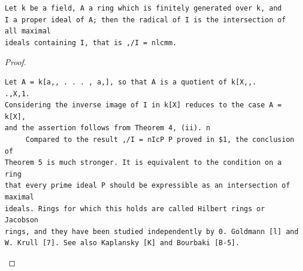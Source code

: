 \begin{theorem}\label{mcrt-auto-theorem-5-5}\uses{}
\begin{verbatim}
Let k be a field, A a ring which is finitely generated over k, and
I a proper ideal of A; then the radical of I is the intersection of all maximal
ideals containing I, that is ,/I = nlcmm.
\end{verbatim}
\end{theorem}
\begin{proof}
\begin{verbatim}
Let A = k[a,, . . . , a,], so that A is a quotient of k[X,,.               .,X,1.
Considering the inverse image of I in k[X] reduces to the case A = k[X],
and the assertion follows from Theorem 4, (ii). n
     Compared to the result ,/I = nIcP P proved in $1, the conclusion of
Theorem 5 is much stronger. It is equivalent to the condition on a ring
that every prime ideal P should be expressible as an intersection of maximal
ideals. Rings for which this holds are called Hilbert rings or Jacobson
rings, and they have been studied independently by 0. Goldmann [l] and
W. Krull [7]. See also Kaplansky [K] and Bourbaki [B-5].
\end{verbatim}
\end{proof}


